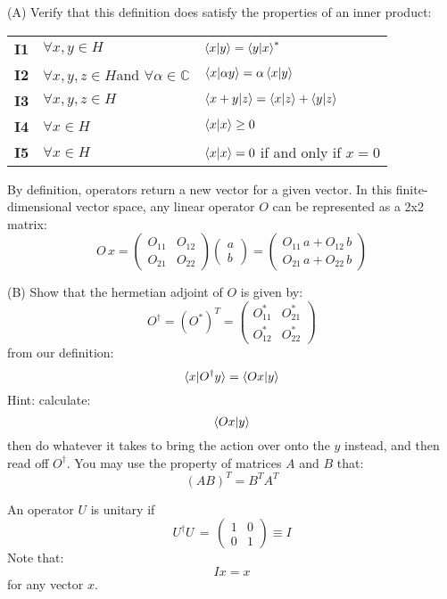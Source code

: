 \documentclass[12pt]{article}
\begin{document}
\noindent
(A) Verify that this definition does satisfy the properties of an inner product:\\

\begin{tabular}{lll}
  {\bf I1} & $\forall x,y \in H$ & $\braket{x|y} = \braket{y|x}^*$\\
{\bf I2} & $\forall x,y,z \in H$and $\forall \alpha \in \mathbb{C}$ &
$\braket{x|\alpha y} = \alpha \braket{x|y}$\\
{\bf I3} & $\forall x,y,z \in H$ & $\braket{x+y|z} = \braket{x|z}+\braket{y|z}$\\
{\bf I4} & $\forall x \in H$ & $\braket{x|x} \geq 0$ \\
{\bf I5} & $\forall x \in H$ & $\braket{x|x}=0$ if and only if $x=0$ \\
\end{tabular}

\vskip 1cm

\noindent
By definition, operators return a new vector for a given vector.  In this finite-dimensional vector space, any linear operator $O$ can be represented as a 2x2 matrix:
$$O \, x = 
\begin{pmatrix} O_{11} & O_{12} \\ O_{21} & O_{22} \end{pmatrix}
\begin{pmatrix} a \\ b \end{pmatrix}
= 
\begin{pmatrix} O_{11} \, a + O_{12}\, b\\ O_{21} \, a + O_{22} \, b \end{pmatrix}
$$

\noindent
(B) Show that the hermetian adjoint of $O$ is given by:
$$O^{\dagger} = \left(O^*\right)^T = \begin{pmatrix} O_{11}^* & O_{21}^* \\ O_{12}^* & O_{22}^* \end{pmatrix}$$
from our definition:
$$\braket{x|O^\dagger y} = \braket{Ox | y}$$
Hint:  calculate:
$$\braket{Ox|y}$$
then do whatever it takes to bring the action over onto the $y$ instead, and then read off $O^\dagger$.
You may use the property of matrices $A$ and $B$ that:
$$(AB)^T = B^T A^T$$

\vskip 1cm

\noindent
An operator $U$ is unitary if 
$$U^\dagger U \, = \, \begin{pmatrix} 1 & 0 \\ 0 & 1 \end{pmatrix} \equiv I$$
Note that:
$$Ix=x$$
for any vector $x$.\\
\end{document}
